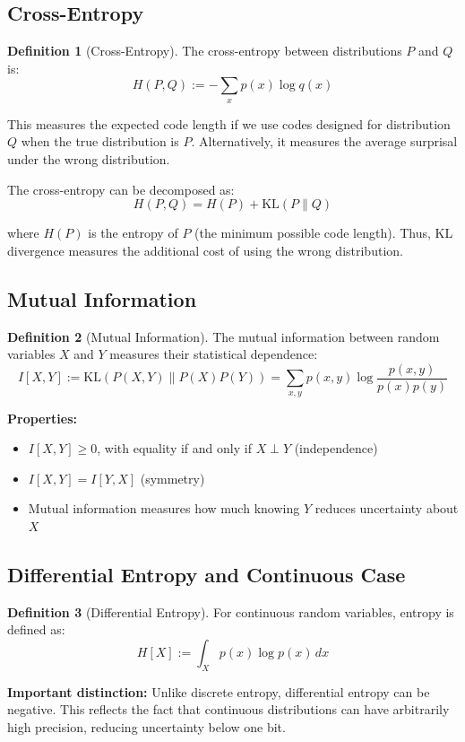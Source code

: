 \documentclass[12pt,a4paper]{article}
\theoremstyle{definition}
\newtheorem{definition}{Definition}[section]
\begin{document}
\subsection{Cross-Entropy}

\begin{definition}[Cross-Entropy]
The cross-entropy between distributions $P$ and $Q$ is:
\[
H(P, Q) := -\sum_x p(x) \log q(x)
\]

This measures the expected code length if we use codes designed for distribution $Q$ when the true distribution is $P$. Alternatively, it measures the average surprisal under the wrong distribution.

The cross-entropy can be decomposed as:
\[
H(P, Q) = H(P) + \text{KL}(P \| Q)
\]

where $H(P)$ is the entropy of $P$ (the minimum possible code length). Thus, KL divergence measures the additional cost of using the wrong distribution.
\end{definition}

\subsection{Mutual Information}

\begin{definition}[Mutual Information]
The mutual information between random variables $X$ and $Y$ measures their statistical dependence:
\[
I[X, Y] := \text{KL}(P(X,Y) \| P(X) P(Y)) = \sum_{x,y} p(x,y) \log \frac{p(x,y)}{p(x)p(y)}
\]

\textbf{Properties:}
\begin{itemize}
    \item $I[X, Y] \geq 0$, with equality if and only if $X \perp Y$ (independence)
    \item $I[X, Y] = I[Y, X]$ (symmetry)
    \item Mutual information measures how much knowing $Y$ reduces uncertainty about $X$
\end{itemize}
\end{definition}

\subsection{Differential Entropy and Continuous Case}

\begin{definition}[Differential Entropy]
For continuous random variables, entropy is defined as:
\[
H[X] := \int_X p(x) \log p(x) \, dx
\]

\textbf{Important distinction:} Unlike discrete entropy, differential entropy can be negative. This reflects the fact that continuous distributions can have arbitrarily high precision, reducing uncertainty below one bit.
\end{definition}
\end{document}
